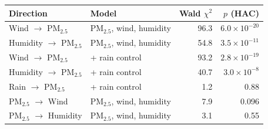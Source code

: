 \begin{tabular}{|l|l|r|r|}
\hline
\textbf{Direction} & \textbf{Model} & \textbf{Wald $\chi^2$} & \textbf{$p$ (HAC)} \\\hline
Wind $\to$ PM$_{2.5}$ & PM$_{2.5}$, wind, humidity & 96.3 & $6.0\times10^{-20}$ \\\hline
Humidity $\to$ PM$_{2.5}$ & PM$_{2.5}$, wind, humidity & 54.8 & $3.5\times10^{-11}$ \\\hline
Wind $\to$ PM$_{2.5}$ & + rain control & 93.2 & $2.8\times10^{-19}$ \\\hline
Humidity $\to$ PM$_{2.5}$ & + rain control & 40.7 & $3.0\times10^{-8}$ \\\hline
Rain $\to$ PM$_{2.5}$ & + rain control & 1.2 & 0.88 \\\hline
PM$_{2.5}$ $\to$ Wind & PM$_{2.5}$, wind, humidity & 7.9 & 0.096 \\\hline
PM$_{2.5}$ $\to$ Humidity & PM$_{2.5}$, wind, humidity & 3.1 & 0.55 \\\hline
\end{tabular}
